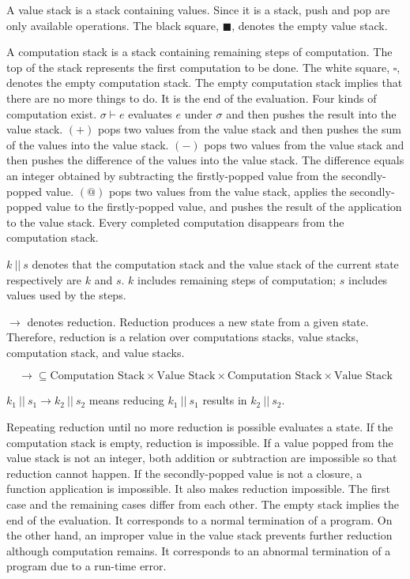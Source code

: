 A value stack is a stack containing values. Since it is a stack, push and pop are
only available operations. The black square, $\blacksquare$, denotes the empty
value stack.

A computation stack is a stack containing remaining steps of computation. The top
of the stack represents the first computation to be done. The white square,
$\square$, denotes the empty computation stack. The empty computation stack
implies that there are no more things to do. It is the end of the evaluation.
Four kinds of computation exist. $\sigma\vdash e$ evaluates $e$ under $\sigma$
and then pushes the result into the value stack. $(+)$ pops two values from the
value stack and then pushes the sum of the values into the value stack. $(-)$
pops two values from the value stack and then pushes the difference of the values
into the value stack. The difference equals an integer obtained by subtracting
the firstly-popped value from the secondly-popped value. $(@)$ pops two values
from the value stack, applies the secondly-popped value to the firstly-popped
value, and pushes the result of the application to the value stack. Every
completed computation disappears from the computation stack.

$k\ ||\ s$ denotes that the computation stack and the value stack of the current
state respectively are $k$ and $s$. $k$ includes remaining steps of computation;
$s$ includes values used by the steps.

$\rightarrow$ denotes reduction. Reduction produces a new state from a given
state. Therefore, reduction is a relation over computations stacks, value stacks,
computation stack, and value stacks.

\[\rightarrow \subseteq
\text{Computation Stack}\times\text{Value Stack}
\times\text{Computation Stack}\times\text{Value Stack} \]

$k_1\ ||\ s_1\rightarrow k_2\ ||\ s_2$ means reducing $k_1\ ||\ s_1$ results in
$k_2\ ||\ s_2$.

Repeating reduction until no more reduction is possible evaluates a state. If the
computation stack is empty, reduction is impossible. If a value popped from the
value stack is not an integer, both addition or subtraction are impossible so
that reduction cannot happen. If the secondly-popped value is not a closure, a
function application is impossible. It also makes reduction impossible. The first
case and the remaining cases differ from each other. The empty stack implies the
end of the evaluation. It corresponds to a normal termination of a program. On
the other hand, an improper value in the value stack prevents further reduction
although computation remains. It corresponds to an abnormal termination of a
program due to a run-time error.

